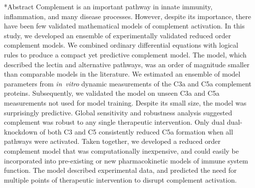 \documentclass[12pt]{article}
\makeatletter
\renewcommand\section{\@startsection
	{subsection}{2}{0mm}
	{-0.2in}
	{0.05\baselineskip}
	{\normalfont\large\bfseries}}
\makeatother
\begin{document}
\section*{Abstract}
Complement is an important pathway in innate immunity, inflammation, and many disease processes.
However, despite its importance, there have been few validated mathematical models of complement activation.
In this study, we developed an ensemble of experimentally validated reduced order complement models.
We combined ordinary differential equations with logical rules to produce a compact yet predictive complement model.
The model,  which described the lectin and alternative pathways, was an order of magnitude smaller than comparable models in the literature.
We estimated an ensemble of model parameters from \textit{in~vitro} dynamic measurements of the C3a and C5a complement proteins.
Subsequently, we validated the model on unseen C3a and C5a measurements not used for model training.
Despite its small size, the model was surprisingly predictive.
Global sensitivity and robustness analysis suggested complement was robust to any single therapeutic intervention.
Only dual dual-knockdown of both C3 and C5 consistently reduced C5a formation when all pathways were activated.
Taken together, we developed a reduced order complement model that was computationally inexpensive,
and could easily be incorporated into pre-existing or new pharmacokinetic models of immune system function.
The model described experimental data, and predicted the need for multiple points of therapeutic intervention to disrupt complement activation.

\end{document}
